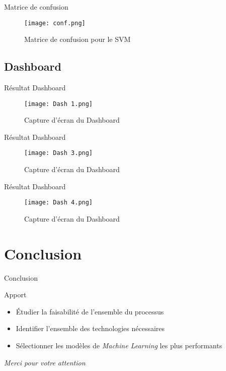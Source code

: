 \documentclass[10pt,sans,usenames,dvipsnames,english,compress]{beamer}
\begin{document}
\begin{frame}{Matrice de confusion}
    \begin{figure}[!h]
    \centering
    \texttt{[image: conf.png]}
    \caption{Matrice de confusion pour le SVM}
    \end{figure}
\end{frame}

\subsection{Dashboard}
\begin{frame}{Résultat Dashboard}
    \begin{figure}[!h]
    \centering
    \texttt{[image: Dash 1.png]}
    \caption{Capture d'écran du Dashboard}
    \end{figure}
\end{frame}

\begin{frame}{Résultat Dashboard}
    \begin{figure}[!h]
    \centering
    \texttt{[image: Dash 3.png]}
    \caption{Capture d'écran du Dashboard}
    \end{figure}
\end{frame}

\begin{frame}{Résultat Dashboard}
    \begin{figure}[!h]
    \centering
    \texttt{[image: Dash 4.png]}
    \caption{Capture d'écran du Dashboard}
    \end{figure}
\end{frame}

\section{Conclusion}
\begin{frame}{Conclusion}
	\begin{exampleblock}{Apport}
		\begin{itemize}
		\item Étudier la faisabilité de l’ensemble du processus
		\item Identifier l’ensemble des technologies nécessaires
		\item Sélectionner les modèles de \emph{Machine Learning} les plus performants
		\end{itemize}
	\end{exampleblock}

\end{frame}

\begin{frame}{}
  \centering \huge
  \emph{Merci pour votre attention}
\end{frame}
\end{document}
